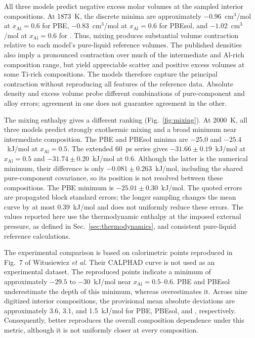 All three models predict negative excess molar volumes at the sampled interior compositions.
At 1873~K, the discrete minima are approximately $-0.96$~cm$^3$/mol at $x_{\mathrm{Al}}=0.6$ for PBE, $-0.83$~cm$^3$/mol at $x_{\mathrm{Al}}=0.6$ for PBEsol, and $-1.02$~cm$^3$/mol at $x_{\mathrm{Al}}=0.6$ for \rscan{}.
Thus, mixing produces substantial volume contraction relative to each model's pure-liquid reference volumes.
The published densities also imply a pronounced contraction over much of the intermediate and Al-rich composition range, but yield appreciable scatter and positive excess volumes at some Ti-rich compositions.
The models therefore capture the principal contraction without reproducing all features of the reference data.
Absolute density and excess volume probe different combinations of pure-component and alloy errors; agreement in one does not guarantee agreement in the other.


The mixing enthalpy gives a different ranking (Fig.~\ref{fig:mixing}).
At 2000~K, all three models predict strongly exothermic mixing and a broad minimum near intermediate composition.
The PBE and PBEsol minima are $-25.0$ and $-25.4$~kJ/mol at $x_{\mathrm{Al}}=0.5$.
The extended 60~ps \rscan{} series gives $-31.66\pm0.19$~kJ/mol at $x_{\mathrm{Al}}=0.5$ and $-31.74\pm0.20$~kJ/mol at 0.6.
Although the latter is the numerical minimum, their difference is only $-0.081\pm0.263$~kJ/mol, including the shared pure-component covariance, so its position is not resolved between these compositions.
The PBE minimum is $-25.01\pm0.30$~kJ/mol.
The quoted errors are propagated block standard errors; the longer \rscan{} sampling changes the mean curve by at most 0.39~kJ/mol and does not uniformly reduce these errors.
The values reported here use the thermodynamic enthalpy at the imposed external pressure, as defined in Sec.~\ref{sec:thermodynamics}, and consistent pure-liquid reference calculations.

The experimental comparison is based on calorimetric points reproduced in Fig.~7 of Witusiewicz \textit{et al.}\cite{Witusiewicz2008}
Their CALPHAD curve is not used as an experimental dataset.
The reproduced points indicate a minimum of approximately $-29.5$ to $-30$~kJ/mol near $x_{\mathrm{Al}}=0.5$--0.6.
PBE and PBEsol underestimate the depth of this minimum, whereas \rscan{} overestimates it.
Across nine digitized interior compositions, the provisional mean absolute deviations are approximately 3.6, 3.1, and 1.5~kJ/mol for PBE, PBEsol, and \rscan{}, respectively.
Consequently, \rscan{} better reproduces the overall composition dependence under this metric, although it is not uniformly closer at every composition.

